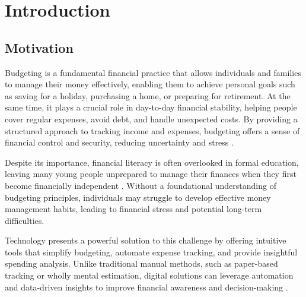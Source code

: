 \documentclass{l4proj}
\begin{document}

\def\consentname {Kirsty Balfour} %
\def\consentdate {24 September 2024} %
%
\educationalconsent


\tableofcontents


\chapter{Introduction}


\section{Motivation}
Budgeting is a fundamental financial practice that allows individuals and families to manage their money effectively, enabling them to achieve personal goals such as saving for a holiday, purchasing a home, or preparing for retirement. At the same time, it plays a crucial role in day-to-day financial stability, helping people cover regular expenses, avoid debt, and handle unexpected costs. By providing a structured approach to tracking income and expenses, budgeting offers a sense of financial control and security, reducing uncertainty and stress \citep{shukri_personal_2024}.

Despite its importance, financial literacy is often overlooked in formal education, leaving many young people unprepared to manage their finances when they first become financially independent \citep{stillwell_financial_2016}. Without a foundational understanding of budgeting principles, individuals may struggle to develop effective money management habits, leading to financial stress and potential long-term difficulties.

Technology presents a powerful solution to this challenge by offering intuitive tools that simplify budgeting, automate expense tracking, and provide insightful spending analysis. Unlike traditional manual methods, such as paper-based tracking or wholly mental estimation, digital solutions can leverage automation and data-driven insights to improve financial awareness and decision-making \citep{sonjaya_exploring_2024}.
\end{document}
